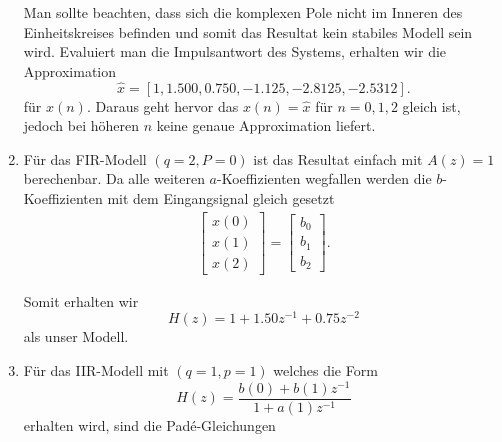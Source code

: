 \begin{beispiel}
\begin{enumerate}
Man sollte beachten, dass sich die komplexen Pole nicht im Inneren des
Einheitskreises befinden und somit das Resultat kein stabiles Modell sein wird.
%
%
%
Evaluiert man die Impulsantwort des Systems, erhalten wir die 
Approximation
\begin{equation}
\hat{x}=[1,1.500,0.750,-1.125,-2.8125,-2.5312].
\end{equation}
für $x(n)$.
Daraus geht hervor das $x(n)= \hat{x}$ für $n= 0,1,2$ gleich ist,
jedoch bei höheren $n$ keine genaue Approximation liefert.

\item Für das FIR-Modell $(q=2,P=0)$ ist das Resultat einfach mit
$A(z)=1$ berechenbar.
Da alle weiteren $a$-Koeffizienten wegfallen werden die $b$-Koeffizienten
mit dem Eingangsignal gleich gesetzt
\begin{equation}\begin{array}{r}
\left[\begin{array}{l}
	x(0) \\
	x(1) \\
	x(2)
\end{array}\right]
=
\left[\begin{array}{l}
	b_0 \\
	b_1 \\
	b_2
	\end{array}\right].
\end{array}\end{equation}

Somit erhalten wir 
\begin{equation}
H(z)=1+1.50 z^{-1}+0.75 z^{-2}
\end{equation}
als unser Modell.

\item Für das IIR-Modell mit $(q=1,p=1)$ welches die Form
\begin{equation}
H(z)=\frac{b(0)+b(1) z^{-1}}{1+a(1) z^{-1}}
\end{equation}
erhalten wird, sind die Padé-Gleichungen


\end{enumerate}
\end{beispiel}
